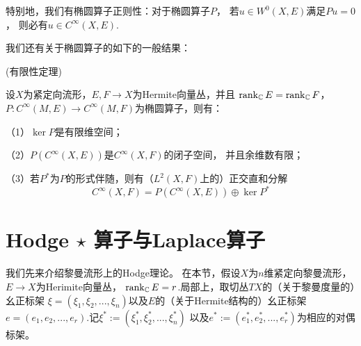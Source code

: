特别地，我们有椭圆算子正则性：对于椭圆算子$P$，
若$u\in W^0(X,E)$满足$Pu=0$，
则必有$u\in C^\infty(X,E)$.

我们还有关于椭圆算子的如下的一般结果：

\begin{lemma}(有限性定理)
\label{椭圆算子-有限性定理-lemma}

设$X$为紧定向流形，$E,F\to X$为Hermite向量丛，并且
$\operatorname{rank}_{\mathbb{C}}E=\operatorname{rank}_{\mathbb{C}}F$，
$P:C^\infty(M,E)\to C^\infty(M,F)$为椭圆算子，则有：

（1）$\ker P$是有限维空间；

（2）$P(C^\infty(X,E))$是$C^\infty(X,F)$的闭子空间，
并且余维数有限；

（3）若$P^*$为$P$的形式伴随，则有（$L^2(X,F)$上的）正交直和分解
$$
  C^\infty(X,F)
=
  P(C^\infty(X,E))\oplus\ker P^*
$$
\end{lemma}


\section{Hodge $\star$ 算子与Laplace算子}

我们先来介绍黎曼流形上的Hodge理论。
在本节，假设$X$为$n$维紧定向黎曼流形，$E\to X$为Herimite向量丛，
$\operatorname{rank}_{\mathbb{C}}E=r$.局部上，取切丛$TX$的（关于黎曼度量的）幺正标架
$\xi=(\xi_1,\xi_2,...,\xi_n)$以及$E$的（关于Hermite结构的）幺正标架
$e=(e_1,e_2,...,e_r)$.记$\xi^*:=(\xi_1^*,\xi_2^*,...,\xi_n^*)$
以及$e^*:=(e_1^*,e_2^*,...,e_r^*)$为相应的对偶标架。


